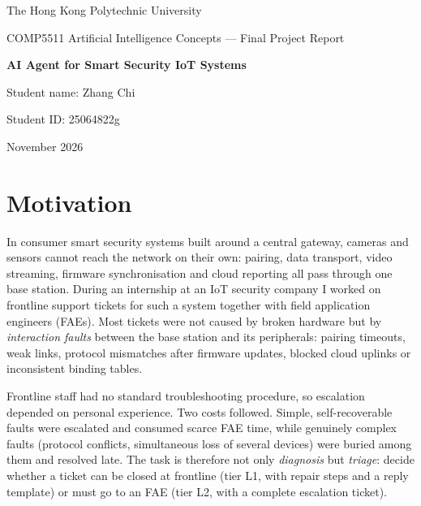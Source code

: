 \documentclass[12pt,a4paper]{article}
\begin{document}
\begin{titlepage}
\centering
\vspace*{4cm}
{\Large The Hong Kong Polytechnic University\par}
\vspace{0.6cm}
{\large COMP5511 Artificial Intelligence Concepts --- Final Project Report\par}
\vspace{2.2cm}
{\LARGE\bfseries AI Agent for Smart Security IoT Systems\par}
\vspace{2.2cm}
{\large Student name: Zhang Chi\par}
\vspace{0.3cm}
{\large Student ID: 25064822g\par}
\vfill
{\large November 2026\par}
\end{titlepage}

\section{Motivation}
In consumer smart security systems built around a central gateway, cameras and sensors cannot reach the
network on their own: pairing, data transport, video streaming, firmware synchronisation and cloud reporting all
pass through one base station. During an internship at an IoT security company I worked on frontline support
tickets for such a system together with field application engineers (FAEs). Most tickets were not caused by
broken hardware but by \emph{interaction faults} between the base station and its peripherals: pairing timeouts,
weak links, protocol mismatches after firmware updates, blocked cloud uplinks or inconsistent binding tables.

Frontline staff had no standard troubleshooting procedure, so escalation depended on personal experience. Two
costs followed. Simple, self-recoverable faults were escalated and consumed scarce FAE time, while genuinely
complex faults (protocol conflicts, simultaneous loss of several devices) were buried among them and resolved late.
The task is therefore not only \emph{diagnosis} but \emph{triage}: decide whether a ticket can be closed at frontline
(tier L1, with repair steps and a reply template) or must go to an FAE (tier L2, with a complete escalation ticket).
\end{document}
